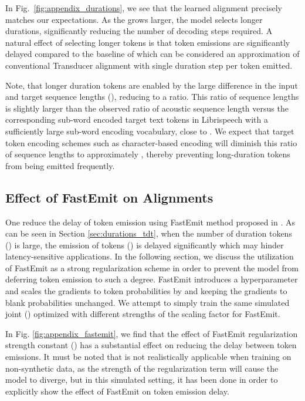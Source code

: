 \documentclass{article}
\begin{document}
In Fig.~\ref{fig:appendix_durations}, we see that the learned alignment precisely matches our expectations. As the  grows larger, the model selects longer durations, significantly reducing the number of decoding steps required. A natural effect of selecting longer tokens is that token emissions are significantly delayed compared to the baseline of  which can be considered an approximation of conventional Transducer alignment with single duration step per token emitted. 

Note, that longer duration tokens are enabled by the large difference in the input and target sequence lengths (), reducing to a  ratio. This ratio of sequence lengths is slightly larger than the observed ratio of acoustic sequence length versus the corresponding sub-word encoded target text tokens in Librispeech with a sufficiently large sub-word encoding vocabulary, close to . We expect that target token encoding schemes such as character-based encoding will diminish this ratio of sequence lengths to approximately , thereby preventing long-duration tokens from being emitted frequently. 

\vspace{-4pt}
\subsection{Effect of FastEmit on Alignments}
\label{sec:fastemit_tdt}
One reduce the delay of token emission using FastEmit method proposed in \cite{yu2021fastemit}. 
As can be seen in Section \ref{sec:durations_tdt}, when the number of duration tokens () is large, the emission of tokens () is delayed significantly which may hinder latency-sensitive applications. In the following section, we discuss the utilization of FastEmit \cite{yu2021fastemit} as a strong regularization scheme in order to prevent the model from deferring token emission to such a degree.
FastEmit introduces a hyperparameter  and scales the gradients to token probabilities by  and keeping the gradients to blank probabilities unchanged. We attempt to simply train the same simulated joint () optimized with different strengths of the  scaling factor for FastEmit.

In Fig. \ref{fig:appendix_fastemit}, we find that the effect of FastEmit regularization strength constant () has a substantial effect on reducing the delay between token emissions. It must be noted that  is not realistically applicable when training on non-synthetic data, as the strength of the regularization term will cause the model to diverge, but in this simulated setting, it has been done in order to explicitly show the effect of FastEmit on token emission delay.
\end{document}
